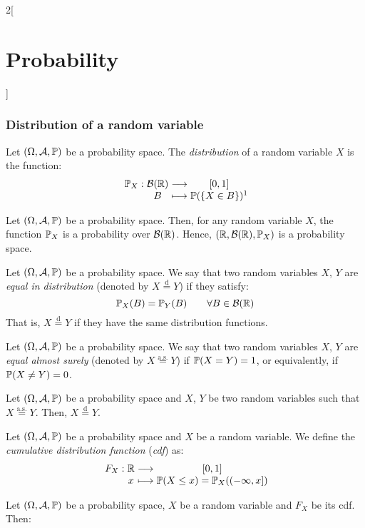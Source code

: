 \documentclass[../../../main.tex]{subfiles}
\begin{document}
\begin{multicols}{2}[\section{Probability}]
  \subsubsection{Distribution of a random variable}
  \begin{definition}
    Let $(\Omega,\mathcal{A},\mathbb{P})$ be a probability space. The \emph{distribution} of a random variable $X$ is the function:
    $$
      \function{\Prob_X}{\mathcal{B}(\RR)}{[0,1]}{B}{\Prob(\{X\in B\})\footnotemark}
    $$
  \end{definition}
  \begin{proposition}
    Let $(\Omega,\mathcal{A},\mathbb{P})$ be a probability space. Then, for any random variable $X$, the function $\mathbb{P}_X$ is a probability over $\mathcal{B}(\mathbb{R})$. Hence, $(\mathbb{R},\mathcal{B}(\mathbb{R}),\mathbb{P}_X)$ is a probability space.
  \end{proposition}
  \begin{definition}
    Let $(\Omega,\mathcal{A},\mathbb{P})$ be a probability space. We say that two random variables $X$, $Y$ are \emph{equal in distribution} (denoted by $X\overset{\text{d}}{=}Y$) if they satisfy: $$\mathbb{P}_X(B)=\mathbb{P}_Y(B)\qquad\forall B\in\mathcal{B}(\mathbb{R})$$ That is, $X\overset{\text{d}}{=}Y$ if they have the same distribution functions.
  \end{definition}
  \begin{definition}
    Let $(\Omega,\mathcal{A},\mathbb{P})$ be a probability space. We say that two random variables $X$, $Y$ are \emph{equal almost surely} (denoted by $X\overset{\text{a.s.}}{=}Y$) if $\mathbb{P}(X=Y)=1$, or equivalently, if $\mathbb{P}(X\ne Y)=0$.
  \end{definition}
  \begin{proposition}
    Let $(\Omega,\mathcal{A},\mathbb{P})$ be a probability space and $X$, $Y$ be two random variables such that $X\overset{\text{a.s.}}{=}Y$. Then, $X\overset{\text{d}}{=}Y$.
  \end{proposition}
  \begin{definition}
    Let $(\Omega,\mathcal{A},\mathbb{P})$ be a probability space and $X$ be a random variable. We define the \emph{cumulative distribution function} (\emph{cdf}) as:
    $$
      \function{F_X}{\RR}{[0,1]}{x}{\Prob(X\leq x)=\Prob_X((-\infty,x])}
    $$
  \end{definition}
  \begin{theorem}
    Let $(\Omega,\mathcal{A},\mathbb{P})$ be a probability space, $X$ be a random variable and $F_X$ be its cdf. Then:

\end{theorem}
\end{multicols}
\end{document}
